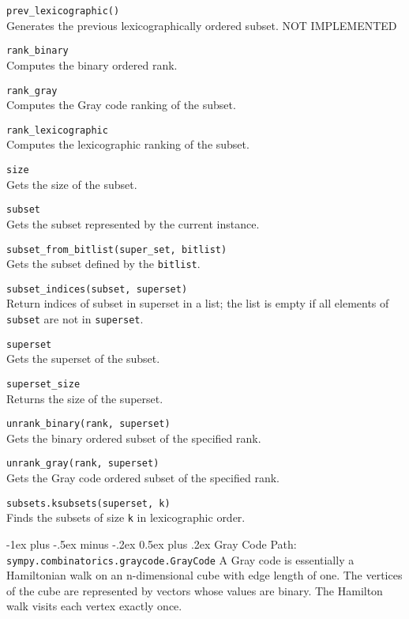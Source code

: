 \documentclass[10pt,landscape]{article}
\makeatletter
\renewcommand{\section}{\@startsection{section}{1}{0mm}%
                                {-1ex plus -.5ex minus -.2ex}%
                                {0.5ex plus .2ex}%
                                {\normalfont\large\bfseries}}
\makeatother
\begin{document}
\begin{multicols}{3}
\verb!prev_lexicographic()!\\
Generates the previous lexicographically ordered subset. NOT IMPLEMENTED

\verb!rank_binary!\\
Computes the binary ordered rank.



\verb!rank_gray!\\
Computes the Gray code ranking of the subset.


\verb!rank_lexicographic!\\
Computes the lexicographic ranking of the subset.



\verb!size!\\
Gets the size of the subset.



\verb!subset!\\
Gets the subset represented by the current instance.


\verb!subset_from_bitlist(super_set, bitlist)!\\
Gets the subset defined by the \verb!bitlist!.



\verb!subset_indices(subset, superset)!\\
Return indices of subset in superset in a list;
the list is empty if all elements of \verb!subset! are not in \verb!superset!.


\verb!superset!\\
Gets the superset of the subset.


\verb!superset_size!\\
Returns the size of the superset.


\verb!unrank_binary(rank, superset)!\\
Gets the binary ordered subset of the specified rank.



\verb!unrank_gray(rank, superset)!\\
Gets the Gray code ordered subset of the specified rank.



\verb!subsets.ksubsets(superset, k)!\\
Finds the subsets of size \verb!k! in lexicographic order.


\section{Gray Code}
Path: \verb!sympy.combinatorics.graycode.GrayCode!
A Gray code is essentially a Hamiltonian walk on an n-dimensional
 cube with edge length of one. The vertices of the cube are
 represented by vectors whose values are binary.
 The Hamilton walk visits each vertex exactly once.


\end{multicols}
\end{document}
